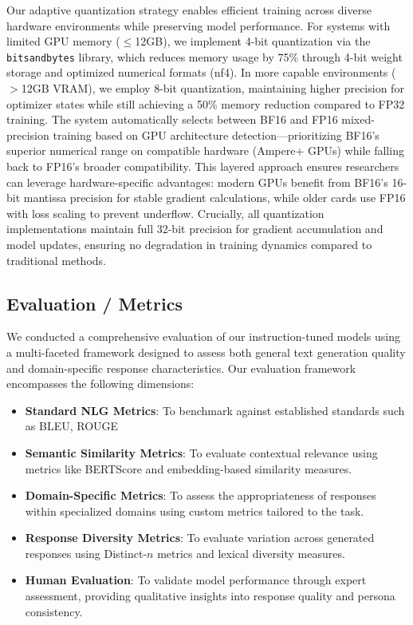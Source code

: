 \documentclass[11pt]{article}
\begin{document}
Our adaptive quantization strategy enables efficient training across diverse hardware environments while preserving model performance. For systems with limited GPU memory ($\leq$12GB), we implement 4-bit quantization via the \texttt{bitsandbytes} library, which reduces memory usage by 75\% through 4-bit weight storage and optimized numerical formats (nf4). In more capable environments ($>$12GB VRAM), we employ 8-bit quantization, maintaining higher precision for optimizer states while still achieving a 50\% memory reduction compared to FP32 training. The system automatically selects between BF16 and FP16 mixed-precision training based on GPU architecture detection—prioritizing BF16’s superior numerical range on compatible hardware (Ampere+ GPUs) while falling back to FP16’s broader compatibility. This layered approach ensures researchers can leverage hardware-specific advantages: modern GPUs benefit from BF16’s 16-bit mantissa precision for stable gradient calculations, while older cards use FP16 with loss scaling to prevent underflow. Crucially, all quantization implementations maintain full 32-bit precision for gradient accumulation and model updates, ensuring no degradation in training dynamics compared to traditional methods.

\subsection{Evaluation / Metrics}
We conducted a comprehensive evaluation of our instruction-tuned models using a multi-faceted framework designed to assess both general text generation quality and domain-specific response characteristics. Our evaluation framework encompasses the following dimensions:

\begin{itemize}
    \item \textbf{Standard NLG Metrics}: To benchmark against established standards such as BLEU, ROUGE
    \item \textbf{Semantic Similarity Metrics}: To evaluate contextual relevance using metrics like BERTScore and embedding-based similarity measures.
    \item \textbf{Domain-Specific Metrics}: To assess the appropriateness of responses within specialized domains using custom metrics tailored to the task.
    \item \textbf{Response Diversity Metrics}: To evaluate variation across generated responses using Distinct-$n$ metrics and lexical diversity measures.
    \item \textbf{Human Evaluation}: To validate model performance through expert assessment, providing qualitative insights into response quality and persona consistency.
\end{itemize}
\end{document}
